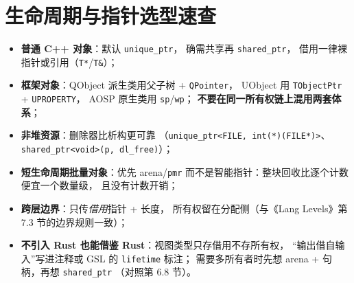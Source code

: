 \documentclass[12pt,a4paper,fontset=fandol]{ctexbook}
\begin{document}
\section{生命周期与指针选型速查}

\begin{bestpractice}[title=落地规则]
\begin{itemize}
  \item \textbf{普通 C++ 对象}：默认 \texttt{unique\_ptr}，
        确需共享再 \texttt{shared\_ptr}，
        借用一律裸指针或引用（\texttt{T*}/\allowbreak{}\texttt{T\&}）；
  \item \textbf{框架对象}：QObject 派生类用父子树 + \texttt{QPointer}，
        UObject 用 \texttt{TObjectPtr} + \texttt{UPROPERTY}，
        AOSP 原生类用 \texttt{sp}/\allowbreak{}\texttt{wp}；
        \textbf{不要在同一所有权链上混用两套体系}；
  \item \textbf{非堆资源}：删除器比析构更可靠
        （\texttt{unique\_\allowbreak{}ptr<FILE, int(*)(FILE*)>}、
        \texttt{shared\_\allowbreak{}ptr<void>(p, dl\_\allowbreak{}free)}）；
  \item \textbf{短生命周期批量对象}：优先 arena/\allowbreak{}\texttt{pmr}
        而不是智能指针：整块回收比逐个计数便宜一个数量级，
        且没有计数开销；
  \item \textbf{跨层边界}：只传\emph{借用}指针 + 长度，
        所有权留在分配侧（与《Lang Levels》第 7.3 节的边界规则一致）；
  \item \textbf{不引入 Rust 也能借鉴 Rust}：视图类型只存借用不存所有权，
        ``输出借自输入''写进注释或 GSL 的 \texttt{lifetime} 标注；
        需要多所有者时先想 arena + 句柄，再想 \texttt{shared\_ptr}
        （对照第 6.8 节）。
\end{itemize}
\end{bestpractice}
\end{document}
